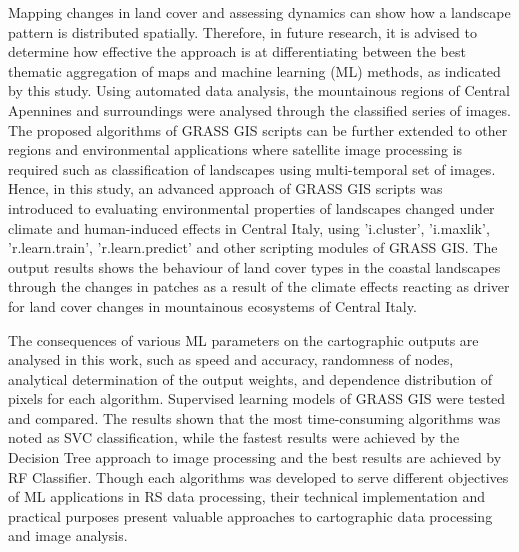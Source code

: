 \documentclass[jimaging,article,submit,pdftex,moreauthors]{Definitions/mdpi}
\begin{document}
Mapping changes in land cover and assessing dynamics can show how a landscape pattern is distributed spatially. Therefore, in future  research, it is advised to determine how effective the approach is at differentiating between the best thematic aggregation of maps and machine learning (ML) methods, as indicated by this study. Using automated data analysis, the mountainous regions of Central Apennines and surroundings were analysed through the classified series of images. The proposed algorithms of GRASS GIS scripts can be further extended to other regions and environmental applications where satellite image processing is required such as classification of landscapes using multi-temporal set of images. Hence, in this study, an advanced approach of GRASS GIS scripts was  introduced to evaluating environmental properties of landscapes changed under climate and human-induced effects in Central Italy, using 'i.cluster', 'i.maxlik', 'r.learn.train', 'r.learn.predict' and other scripting modules of GRASS GIS. The output results shows the behaviour of land cover types in the coastal landscapes through the changes in patches as a result of the climate effects reacting as driver for land cover changes in mountainous ecosystems of Central Italy. 

The consequences of various ML parameters on the cartographic outputs are analysed in this work, such as speed and accuracy, randomness of nodes, analytical determination of the output weights, and dependence distribution of pixels for each algorithm. Supervised learning models of GRASS GIS were tested and compared. The results shown that the most time-consuming algorithms was noted as SVC classification, while the fastest results were achieved by the Decision Tree approach to image processing and the best results are achieved by RF Classifier. Though each algorithms was developed to serve different objectives of ML applications in RS data processing, their technical implementation and practical purposes present valuable approaches to cartographic data processing and image analysis. 



\end{document}

